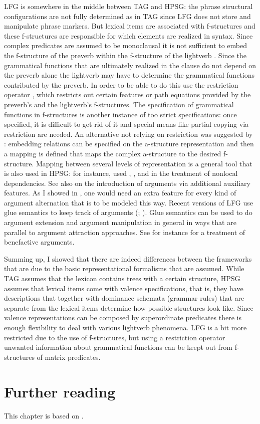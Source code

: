 LFG is somewhere in the middle between TAG and HPSG: the phrase structural configurations are not
fully determined as in TAG since LFG does not store and manipulate phrase markers. But lexical items are
associated with f-structures and these f-structures are responsible for which elements are realized
in syntax. Since complex predicates are assumed to be monoclausal it is not sufficient to embed the
f-structure of the preverb within the f-structure of the lightverb \citep{BHKM2003a-u}. Since the grammatical functions
that are ultimately realized in the clause do not depend on the preverb alone the lightverb may have
to determine the grammatical functions contributed by the preverb. In order to be able to do this \citet{BHKM2003a-u}
use the restriction operator \citep{KW93a-u}, which restricts out certain features or path equations provided by the
preverb's and the lightverb's f-structures. The specification of grammatical functions in
f-structures is another instance of too strict specifications: once specified, it is difficult to get rid of it and special means like partial copying via
restriction are needed. 
An alternative not relying on restriction was suggested by \citet{Butt97a}:
embedding relations can be specified on the a-structure representation and then a mapping is defined
that maps the complex a-structure to the desired f-structure. Mapping between several levels of
representation is a general tool that is also used in HPSG: for instance, \citet*{BMS2001a} used
\argst, \deps, and \comps in the treatment of nonlocal dependencies. See also \citet{Koenig99a} on
the introduction of arguments via additional auxiliary features. As I showed in
\citet[Section~7.5.2.2]{MuellerLehrbuch1}, one would need an extra feature for every kind of argument alternation
that is to be modeled this way. Recent versions of LFG use glue semantics to keep track of arguments
(\citealp*{DLS93a-u}; \citealp[Chapter~8]{Dalrymple2001a-u}). Glue semantics can
be used to do argument extension and argument manipulation in general in ways that are parallel to
argument attraction approaches. See for instance  for a treatment of
benefactive arguments. 


Summing up, I showed that there are indeed differences between the frameworks that are due to the
basic representational formalisms that are assumed. While TAG assumes that the lexicon contains
trees with a certain structure, HPSG assumes that lexical items come with valence specifications,
that is, they have descriptions that together with dominance schemata (grammar rules) that are
separate from the lexical items determine how possible structures look like. Since valence
representations can be composed by superordinate predicates there is enough flexibility to deal with
various lightverb phenomena. LFG is a bit more restricted due to the use of f-structures, but using
a restriction operator unwanted information about grammatical functions can be keept out from
f-structures of matrix predicates.

\section*{Further reading}

This chapter is based on \citet{MuellerPotentialStructure}.



